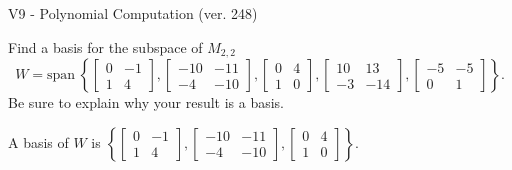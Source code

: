 \begin{exercise}
  \begin{exerciseTitle}V9 - Polynomial Computation (ver. 248)\end{exerciseTitle}
  \begin{exerciseStatement}
    Find a basis for the subspace of \(M_{2,2}\) 
\[W=\mathrm{span}\ \left\{\left[\begin{array}{cc}
0 & -1 \\
1 & 4
\end{array}\right] , \left[\begin{array}{cc}
-10 & -11 \\
-4 & -10
\end{array}\right] , \left[\begin{array}{cc}
0 & 4 \\
1 & 0
\end{array}\right] , \left[\begin{array}{cc}
10 & 13 \\
-3 & -14
\end{array}\right] , \left[\begin{array}{cc}
-5 & -5 \\
0 & 1
\end{array}\right]\right\}.\]
 Be sure to explain why your result is a basis.


  \end{exerciseStatement}
  \begin{exerciseAnswer}
   A basis of \(W\) is  \(\left\{\left[\begin{array}{cc}
0 & -1 \\
1 & 4
\end{array}\right] , \left[\begin{array}{cc}
-10 & -11 \\
-4 & -10
\end{array}\right] , \left[\begin{array}{cc}
0 & 4 \\
1 & 0
\end{array}\right]\right\}\).
  


  \end{exerciseAnswer}
\end{exercise}